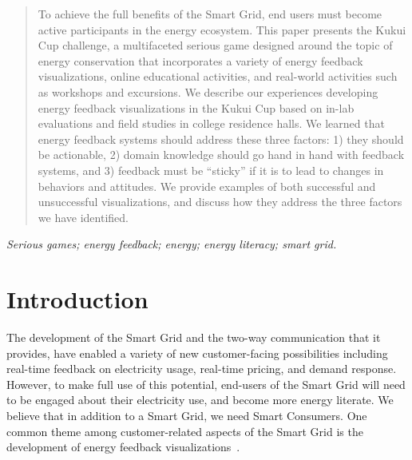 \documentclass[10pt, conference, compsocconf]{IEEEtran-old}
\begin{document}
\begin{abstract}
To achieve the full benefits of the Smart Grid, end users must become active participants in the energy ecosystem. This paper presents the Kukui Cup challenge, a multifaceted serious game designed around the topic of energy conservation that incorporates a variety of energy feedback visualizations, online educational activities, and real-world activities such as workshops and excursions. We describe our experiences developing energy feedback visualizations in the Kukui Cup based on in-lab evaluations and field studies in college residence halls. We learned that energy feedback systems should address these three factors: 1) they should be actionable, 2) domain knowledge should go hand in hand with feedback systems, and 3) feedback must be ``sticky'' if it is to lead to changes in behaviors and attitudes. We provide examples of both successful and unsuccessful visualizations, and discuss how they address the three factors we have identified.
\end{abstract}

\begin{IEEEkeywords}
\emph{Serious games; energy feedback; energy; energy literacy; smart grid.}
\end{IEEEkeywords}


%
\IEEEpeerreviewmaketitle



\section{Introduction}

The development of the Smart Grid and the two-way communication that it provides, have enabled a variety of new customer-facing possibilities including real-time feedback on electricity usage, real-time pricing, and demand response. However, to make full use of this potential, end-users of the Smart Grid will need to be engaged about their electricity use, and become more energy literate. We believe that in addition to a Smart Grid, we need Smart Consumers. One common theme among customer-related aspects of the Smart Grid is the development of energy feedback visualizations~\cite{csdl2-12-12}.
\end{document}
